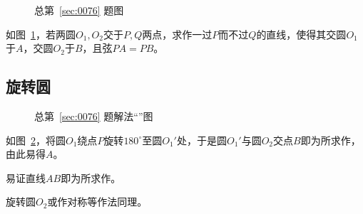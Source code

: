 

\begin{figure}[htbp]
  \centering
  \caption{总第~\ref{sec:0076} 题图} \label{fig:0076}
\end{figure}

如图~\ref{fig:0076}，若两圆$O_1, O_2$交于$P, Q$两点，求作一过$P$而不过$Q$的直线，使得其交圆$O_1$于$A$，交圆$O_2$于$B$，且弦$PA = PB$。

\subsection{旋转圆} \label{subsec:0076-rot}

\begin{figure}[htbp]
  \centering
  \caption{总第~\ref{sec:0076} 题解法“”图}
  \label{fig:0076-rot}
\end{figure}

如图~\ref{fig:0076-rot}，将圆$O_1$绕点$P$旋转$180^\circ$至圆$O_1'$处，于是圆$O_1'$与圆$O_2$交点$B$即为所求作，由此易得$A$。

易证直线$AB$即为所求作。

旋转圆$O_2$或作对称等作法同理。
